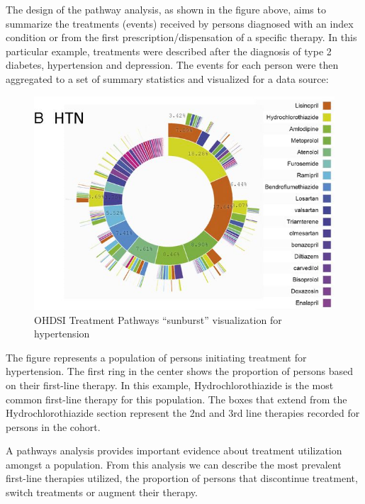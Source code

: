 \documentclass[11pt]{book}
\theoremstyle{definition}
\theoremstyle{definition}
\theoremstyle{definition}
\theoremstyle{remark}
\begin{document}
The design of the pathway analysis, as shown in the figure above, aims to summarize the treatments (events) received by persons diagnosed with an index condition or from the first prescription/dispensation of a specific therapy. In this particular example, treatments were described after the diagnosis of type 2 diabetes, hypertension and depression. The events for each person were then aggregated to a set of summary statistics and visualized for a data source:

\begin{figure}

{\centering \includegraphics[width=1\linewidth]{images/Characterization/pnasTreatmentPathwaysSunburst} 

}

\caption{OHDSI Treatment Pathways “sunburst” visualization for hypertension}\label{fig:treatmentPathwaysSunburstDataViz}
\end{figure}

The figure represents a population of persons initiating treatment for hypertension. The first ring in the center shows the proportion of persons based on their first-line therapy. In this example, Hydrochlorothiazide is the most common first-line therapy for this population. The boxes that extend from the Hydrochlorothiazide section represent the 2nd and 3rd line therapies recorded for persons in the cohort.

A pathways analysis provides important evidence about treatment utilization amongst a population. From this analysis we can describe the most prevalent first-line therapies utilized, the proportion of persons that discontinue treatment, switch treatments or augment their therapy.
\end{document}
